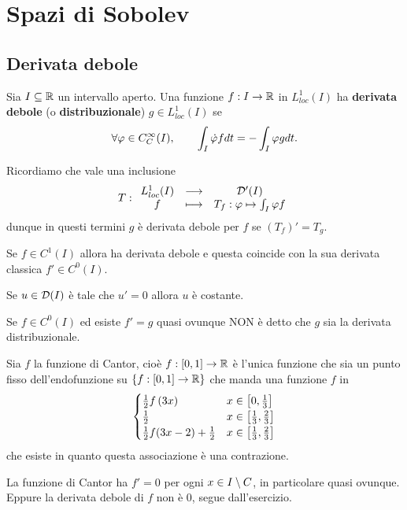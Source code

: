 \chapter{Spazi di Sobolev}

\section{Derivata debole}
\begin{definition}
Sia $I\subseteq \mathbb{R}$ un intervallo aperto. Una funzione $f:I\to \mathbb{R}$ in $L^1_{loc}(I)$ ha \textbf{derivata debole} (o \textbf{distribuzionale}) $g\in L^1_{loc}(I)$ se
\[\forall \varphi\in C^\infty_C(I),\qquad \int_I\dot{\varphi} fdt=-\int_I\varphi gdt.\]
\end{definition}

\begin{remark}
Ricordiamo che vale una inclusione
\[T:\begin{array}{ccc} {L^1_{loc}(I)} & \longrightarrow & {\mathcal{D}'(I)}\\ {f} & \longmapsto & {T_f:\varphi\mapsto \int_I\varphi f} \end{array}\]
dunque in questi termini $g$ \`e derivata debole per $f$ se $(T_f)'=T_g$.
\end{remark}


\begin{remark}
Se $f\in C^1(I)$ allora ha derivata debole e questa coincide con la sua derivata classica $f'\in C^0(I)$.
\end{remark}

\begin{exercise}
Se $u\in \mathcal{D}(I)$ \`e tale che $u'=0$ allora $u$ \`e costante.
\end{exercise}

\begin{remark}
Se $f\in C^0(I)$ ed esiste $f'=g$ quasi ovunque NON \`e detto che $g$ sia la derivata distribuzionale.
\end{remark}

\begin{example}
Sia $f$ la funzione di Cantor, cio\`e $f:[0,1]\to \mathbb{R}$ \`e l'unica funzione che sia un punto fisso dell'endofunzione su $\left\{{f:[0,1]\to\mathbb{R}}\right\}$ che manda una funzione $f$ in
\[\begin{cases}
\frac12f\left({3x}\right) &x\in \left[{0,\frac13}\right]\\
\frac12 &x\in \left[{\frac13,\frac23}\right]\\
\frac12f(3x-2)+\frac12  &x\in \left[{\frac13,\frac23}\right]
\end{cases}\] 
che esiste in quanto questa associazione \`e una contrazione.

La funzione di Cantor ha $f'=0$ per ogni $x\in I\setminus C$, in particolare quasi ovunque. Eppure la derivata debole di $f$ non \`e $0$, segue dall'esercizio.
\end{example}

